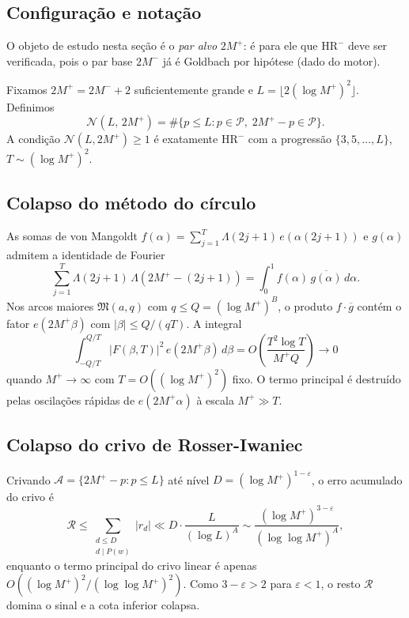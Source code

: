 \documentclass[12pt,a4paper]{article}
\theoremstyle{definition}
\newcommand{\PP}{\mathcal{P}}          %
\newcommand{\HRm}{\mathrm{HR}^{-}}
\begin{document}
	\subsection{Configuração e notação}
	
	O objeto de estudo nesta seção é o \emph{par alvo} $2M^+$:
	é para ele que $\HRm$ deve ser verificada, pois o par base
	$2M^-$ já é Goldbach por hipótese (dado do motor).
	
	Fixamos $2M^+ = 2M^- + 2$ suficientemente grande e
	$L = \lfloor 2(\log M^+)^2 \rfloor$. Definimos
	\[
	\mathcal{N}(L,\, 2M^+) = \#\{p \leq L : p \in \PP,\;
	2M^+ - p \in \PP\}.
	\]
	A condição $\mathcal{N}(L, 2M^+) \geq 1$ é exatamente $\HRm$
	com a progressão $\{3, 5, \ldots, L\}$,
	$T \sim (\log M^+)^2$.
	
	\subsection{Colapso do método do círculo}
	
	As somas de von Mangoldt
	$f(\alpha) = \sum_{j=1}^T \Lambda(2j+1)\,e(\alpha(2j+1))$
	e $g(\alpha)$ admitem a identidade de Fourier
	\[
	\sum_{j=1}^T \Lambda(2j+1)\,\Lambda(2M^+ - (2j+1))
	= \int_0^1 f(\alpha)\,\overline{g(\alpha)}\,d\alpha.
	\]
	Nos arcos maiores $\mathfrak{M}(a,q)$ com
	$q \leq Q = (\log M^+)^B$, o produto $f\cdot\overline{g}$
	contém o fator $e(2M^+\beta)$ com $|\beta| \leq Q/(qT)$.
	A integral
	\[
	\int_{-Q/T}^{Q/T}|F(\beta,T)|^2\,e(2M^+\beta)\,d\beta
	= O\!\left(\frac{T^2\log T}{M^{+}Q}\right) \to 0
	\]
	quando $M^+ \to \infty$ com $T = O((\log M^+)^2)$ fixo. O
	termo principal é destruído pelas oscilações rápidas de
	$e(2M^+\alpha)$ à escala $M^+ \gg T$.
	
	\subsection{Colapso do crivo de Rosser-Iwaniec}
	
	Crivando $\mathcal{A} = \{2M^+ - p : p \leq L\}$ até nível
	$D = (\log M^+)^{1-\varepsilon}$, o erro acumulado do crivo é
	\[
	\mathcal{R} \leq \sum_{\substack{d \leq D \\ d \mid P(w)}} |r_d|
	\ll D \cdot \frac{L}{(\log L)^A}
	\sim \frac{(\log M^+)^{3-\varepsilon}}{(\log\log M^+)^A},
	\]
	enquanto o termo principal do crivo linear é apenas
	$O((\log M^+)^2/(\log\log M^+)^2)$. Como $3 - \varepsilon > 2$
	para $\varepsilon < 1$, o resto $\mathcal{R}$ domina o sinal e
	a cota inferior colapsa.
	
\end{document}

